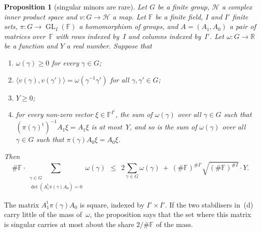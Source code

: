 \documentclass[11pt,a4paper]{article}
\newcommand{\F}{\mathbb{F}}
\newcommand{\m}[1]{\mbox{$#1$}}        %
\theoremstyle{plainx}
\newtheorem{proposition}[theorem]{Proposition}
\theoremstyle{uprightx}
\newcommand{\RR}{\mathbb{R}}
\newcommand{\Hs}{\mathcal{H}}
\newcommand{\GL}{\operatorname{GL}}
\newcommand{\tp}{\mathrm{t}}
\newcommand{\ip}[2]{\langle #1,#2\rangle}
\begin{document}
\begin{proposition}[singular minors are rare]\label{p:minors}
Let $G$ be a finite group, $\Hs$ a complex inner product space and \m{v\colon G\to\Hs} a map. Let $\F$ be a finite
field, $I$ and $I'$ finite sets, \m{\pi\colon G\to\GL_I(\F)} a homomorphism of groups, and $A=(A_1,A_0)$ a pair of
matrices over~$\F$ with rows indexed by~$I$ and columns indexed by~$I'$. Let \m{\omega\colon G\to\RR} be a function
and $Y$ a real number. Suppose that
\begin{enumerate}[label=\textup{(\alph*)},leftmargin=2.2em,itemsep=2pt,topsep=2pt]
\item \m{\omega(\gamma)\ge0} for every $\gamma\in G$;
\item \m{\ip{v(\gamma)}{v(\gamma')}=\omega(\gamma^{-1}\gamma')} for all $\gamma,\gamma'\in G$;
\item \m{Y\ge0};
\item for every non-zero vector \m{\xi\in\F^{I'}}, the sum of $\omega(\gamma)$ over all $\gamma\in G$ such that
\m{(\pi(\gamma)^{\tp})^{-1}A_1\xi=A_1\xi} is at most~$Y$, and so is the sum of $\omega(\gamma)$ over all
$\gamma\in G$ such that \m{\pi(\gamma)A_0\xi=A_0\xi}.
\end{enumerate}
Then
\[\#\F\cdot\sum_{\substack{\gamma\in G\\ \det(A_1^{\tp}\pi(\gamma)A_0)=0}}\omega(\gamma)\ \ \le\ \ 2\sum_{\gamma\in G}\omega(\gamma)
\ +\ (\#\F)^{\#I'}\sqrt{(\#\F)^{\#I}}\cdot Y .\]
\end{proposition}

The matrix \m{A_1^{\tp}\pi(\gamma)A_0} is square, indexed by \m{I'\times I'}. If the two stabilisers in~(d) carry
little of the mass of~$\omega$, the proposition says that the set where this matrix is singular carries at most
about the share \m{2/\#\F} of the mass.
\end{document}
